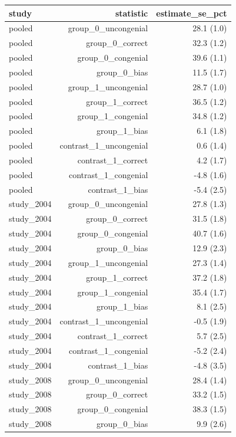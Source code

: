 \begin{tabular}{lrr}
\toprule
study & statistic & estimate\_se\_pct \\
\midrule
pooled & group\_0\_uncongenial & 28.1 (1.0) \\
pooled & group\_0\_correct & 32.3 (1.2) \\
pooled & group\_0\_congenial & 39.6 (1.1) \\
pooled & group\_0\_bias & 11.5 (1.7) \\
pooled & group\_1\_uncongenial & 28.7 (1.0) \\
pooled & group\_1\_correct & 36.5 (1.2) \\
pooled & group\_1\_congenial & 34.8 (1.2) \\
pooled & group\_1\_bias & 6.1 (1.8) \\
pooled & contrast\_1\_uncongenial & 0.6 (1.4) \\
pooled & contrast\_1\_correct & 4.2 (1.7) \\
pooled & contrast\_1\_congenial & -4.8 (1.6) \\
pooled & contrast\_1\_bias & -5.4 (2.5) \\
study\_2004 & group\_0\_uncongenial & 27.8 (1.3) \\
study\_2004 & group\_0\_correct & 31.5 (1.8) \\
study\_2004 & group\_0\_congenial & 40.7 (1.6) \\
study\_2004 & group\_0\_bias & 12.9 (2.3) \\
study\_2004 & group\_1\_uncongenial & 27.3 (1.4) \\
study\_2004 & group\_1\_correct & 37.2 (1.8) \\
study\_2004 & group\_1\_congenial & 35.4 (1.7) \\
study\_2004 & group\_1\_bias & 8.1 (2.5) \\
study\_2004 & contrast\_1\_uncongenial & -0.5 (1.9) \\
study\_2004 & contrast\_1\_correct & 5.7 (2.5) \\
study\_2004 & contrast\_1\_congenial & -5.2 (2.4) \\
study\_2004 & contrast\_1\_bias & -4.8 (3.5) \\
study\_2008 & group\_0\_uncongenial & 28.4 (1.4) \\
study\_2008 & group\_0\_correct & 33.2 (1.5) \\
study\_2008 & group\_0\_congenial & 38.3 (1.5) \\
study\_2008 & group\_0\_bias & 9.9 (2.6) \\

\end{tabular}
